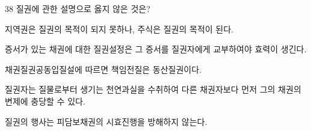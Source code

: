 \begin{question}{38}
질권에 관한 설명으로 옳지 않은 것은?
\begin{choices}
  \item 지역권은 질권의 목적이 되지 못하나, 주식은 질권의 목적이 된다.
  \item 증서가 있는 채권에 대한 질권설정은 그 증서를 질권자에게 교부하여야 효력이 생긴다.
  \item 채권질권공동입질설에 따르면 책임전질은 동산질권이다.
  \item 질권자는 질물로부터 생기는 천연과실을 수취하여 다른 채권자보다 먼저 그의 채권의 변제에 충당할 수 있다.
  \item 질권의 행사는 피담보채권의 시효진행을 방해하지 않는다.
\end{choices}
\end{question}
